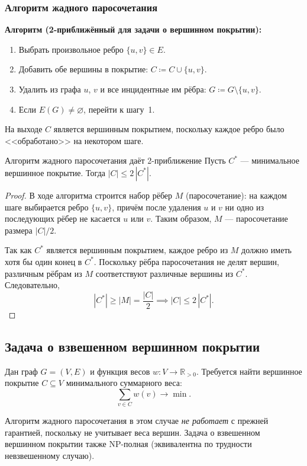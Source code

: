 \subsubsection*{Алгоритм жадного паросочетания}

\textbf{Алгоритм (2-приближённый для задачи о вершинном покрытии):}
\begin{enumerate}
	\item Выбрать произвольное ребро $\{u,v\} \in E$.
	\item Добавить обе вершины в покрытие: $C \coloneqq C \cup \{u, v\}$.
	\item Удалить из графа $u$, $v$ и все инцидентные им рёбра: $G \coloneqq G \setminus \{u,v\}$.
	\item Если $E(G) \neq \varnothing$, перейти к шагу~1.
\end{enumerate}

\medskip

На выходе $C$ является вершинным покрытием, поскольку каждое ребро было <<обработано>> на некотором шаге.

\begin{Statement}{Алгоритм жадного паросочетания даёт 2-приближение}{}
	Пусть $C^*$ — минимальное вершинное покрытие. Тогда $|C| \leq 2\,|C^*|$.
\end{Statement}

\begin{proof}
В ходе алгоритма строится набор рёбер $M$ (паросочетание): на каждом шаге выбирается ребро $\{u,v\}$, причём после удаления $u$ и $v$ ни одно из последующих рёбер не касается $u$ или $v$. Таким образом, $M$ — паросочетание размера $|C|/2$.

Так как $C^*$ является вершинным покрытием, каждое ребро из $M$ должно иметь хотя бы один конец в $C^*$. Поскольку рёбра паросочетания не делят вершин, различным рёбрам из $M$ соответствуют различные вершины из $C^*$. Следовательно,
\[
|C^*| \geq |M| = \frac{|C|}{2} \implies |C| \leq 2\,|C^*|. 
\]
\end{proof}

\subsection{Задача о взвешенном вершинном покрытии}

Дан граф $G=(V,E)$ и функция весов $w\colon V \to \mathbb{R}_{>0}$. Требуется найти вершинное покрытие $C\subseteq V$ минимального суммарного веса:
\[
\sum_{v \in C} w(v) \to \min.
\]

Алгоритм жадного паросочетания в этом случае \emph{не работает} с прежней гарантией, поскольку не учитывает веса вершин. Задача о взвешенном вершинном покрытии также NP-полная (эквивалентна по трудности невзвешенному случаю).

